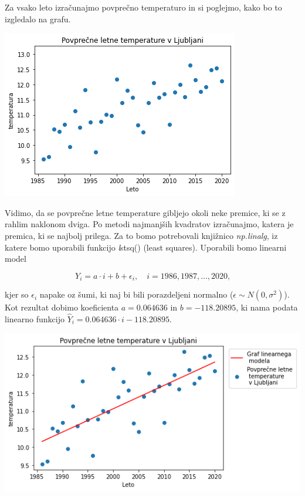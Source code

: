 \documentclass[12pt, a4paper]{article}
\begin{document}
Za vsako leto izračunajmo povprečno temperaturo in si poglejmo, kako bo to 
izgledalo na grafu.

\begin{center}
    \includegraphics[scale=0.7]{Naloga_3_02}
\end{center}

Vidimo, da se povprečne letne temperature gibljejo okoli neke premice, ki se 
z rahlim naklonom dviga. Po metodi najmanjših kvadratov izračunajmo, katera je 
premica, ki se najbolj prilega. Za to bomo potrebovali knjižnico \emph{np.linalg},
iz katere bomo uporabili funkcijo \emph lstsq() (least squares). Uporabili 
bomo linearni model

$$ Y_i = a \cdot i + b + \epsilon_i, \quad i = 1986, 1987, \dots, 2020 \text{,}
$$

kjer so $\epsilon_i$ napake oz šumi, ki naj bi bili porazdeljeni normalno 
($\epsilon \sim N(0, \sigma^2)$). Kot rezultat dobimo koeficienta 
$a = 0.064636$ in $b = -118.20895$, ki nama podata linearno funkcijo 
$\hat{Y}_i = 0.064636 \cdot i - 118.20895$. 

\begin{center}
    \includegraphics[scale=0.7]{Naloga_3_03}
\end{center}
\end{document}
